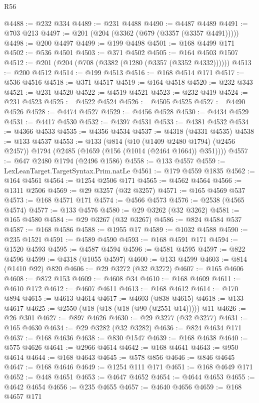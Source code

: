 \begin{lexlean}{R56}
\begin{coremodule}
{{{{{{{{{{{{{{{{{{{{{{{{{{{{{{{{{{{{{{{{{{{{{{{{{{{{{{{{{{{{{{{{{{{{{{{{{{{{{{{{{{{{{{{{{{{{{{{{{{{{{{{{{{{{{{{{{{{{{{{{{{{{{{{{{{{{{{{{{{{{{{{{{{{{{{{{{{{{{{{{{{{{{{{{{{{{{{{{{{{{{{{{{{{{{{{{{{{{{{{{{{{{{{{{{{{@4488 := @232 @334
@4489 := @231 @4488
@4490 := @4487 @4489
@4491 := @703 @213
@4497 := @201 (@204 (@3362 (@679 (@3357 (@3357 @4491)))))
@4498 := @200 @4497
@4499 := @199 @4498
@4501 := @168 @4499 @171
@4502 := @536 @4501
@4503 := @371 @4502
@4505 := @164 @4503 @1507
@4512 := @201 (@204 (@708 (@3382 (@1280 (@3357 (@3352 @4332))))))
@4513 := @200 @4512
@4514 := @199 @4513
@4516 := @168 @4514 @171
@4517 := @536 @4516
@4518 := @371 @4517
@4519 := @164 @4518
@4520 := @232 @343
@4521 := @231 @4520
@4522 := @4519 @4521
@4523 := @232 @419
@4524 := @231 @4523
@4525 := @4522 @4524
@4526 := @4505 @4525
@4527 := @4490 @4526
@4528 := @4474 @4527
@4529 := @4456 @4528
@4530 := @4434 @4529
@4531 := @4417 @4530
@4532 := @4397 @4531
@4533 := @4381 @4532
@4534 := @4366 @4533
@4535 := @4356 @4534
@4537 := @4318 (@4331 @4535)
@4538 := @133 @4537
@4553 := @133
    (@814
      (@10 (@1409 @2480 @1794) (@2456 @2457))
      @1794
      (@2485 (@1659 (@156 (@1014 (@2464 @1664)) @351))))
@4557 := @647 @2480 @1794 (@2496 @1586)
@4558 := @133 @4557
@4559 := LexLeanTarget.TargetSyntax.Prim.natLe
@4561 := @179 @4559 @1835
@4562 := @164 @4561
@4564 := @1254 @2506 @171
@4565 := @4562 @4564
@4566 := @1311 @2506
@4569 := @29 @3257 (@32 @3257)
@4571 := @165 @4569 @537
@4573 := @168 @4571 @171
@4574 := @4566 @4573
@4576 := @2538 (@4565 @4574)
@4577 := @133 @4576
@4580 := @29 @3262 (@32 @3262)
@4581 := @165 @4580
@4584 := @29 @3267 (@32 @3267)
@4586 := @824 @4584 @537
@4587 := @168 @4586
@4588 := @1955 @17
@4589 := @1032 @4588
@4590 := @235 @1521
@4591 := @4589 @4590
@4593 := @168 @4591 @171
@4594 := @1520 @4593
@4595 := @4587 @4594
@4596 := @4581 @4595
@4597 := @822 @4596
@4599 := @4318 (@1055 @4597)
@4600 := @133 @4599
@4603 := @814 (@1410 @92) @820
@4606 := @29 @3272 (@32 @3272)
@4607 := @165 @4606
@4608 := @872 @153
@4609 := @4608 @34
@4610 := @168 @4609
@4611 := @4610 @172
@4612 := @4607 @4611
@4613 := @168 @4612
@4614 := @170 @894
@4615 := @4613 @4614
@4617 := @4603 (@838 @4615)
@4618 := @133 @4617
@4625 := @2550 (@18 (@18 (@18 (@90 (@2551 @14))))) @11
@4626 := @26 @301
@4627 := @897 @4626
@4630 := @29 @3277 (@32 @3277)
@4631 := @165 @4630
@4634 := @29 @3282 (@32 @3282)
@4636 := @824 @4634 @171
@4637 := @168 @4636
@4638 := @830 @1547
@4639 := @168 @4638
@4640 := @575 @4626
@4641 := @2966 @4614
@4642 := @168 @4641
@4643 := @950 @4614
@4644 := @168 @4643
@4645 := @578 @856
@4646 := @846 @4645
@4647 := @168 @4646
@4649 := @1254 @111 @171
@4651 := @168 @4649 @171
@4652 := @448 @4651
@4653 := @4647 @4652
@4654 := @4644 @4653
@4655 := @4642 @4654
@4656 := @235 @4655
@4657 := @4640 @4656
@4659 := @168 @4657 @171
}}}}}}}}}}}}}}}}}}}}}}}}}}}}}}}}}}}}}}}}}}}}}}}}}}}}}}}}}}}}}}}}}}}}}}}}}}}}}}}}}}}}}}}}}}}}}}}}}}}}}}}}}}}}}}}}}}}}}}}}}}}}}}}}}}}}}}}}}}}}}}}}}}}}}}}}}}}}}}}}}}}}}}}}}}}}}}}}}}}}}}}}}}}}}}}}}}}}}}}}}}}}}}}}}}}
\end{coremodule}
\end{lexlean}
